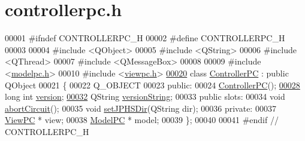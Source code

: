 \hypertarget{controllerpc_8h_source}{}\section{controllerpc.\+h}

\begin{DoxyCode}
00001 \textcolor{preprocessor}{#ifndef CONTROLLERPC\_H}
00002 \textcolor{preprocessor}{#define CONTROLLERPC\_H}
00003 
00004 \textcolor{preprocessor}{#include <QObject>}
00005 \textcolor{preprocessor}{#include <QString>}
00006 \textcolor{preprocessor}{#include <QThread>}
00007 \textcolor{preprocessor}{#include <QMessageBox>}
00008 
00009 \textcolor{preprocessor}{#include <\hyperlink{modelpc_8h}{modelpc.h}>}
00010 \textcolor{preprocessor}{#include <\hyperlink{viewpc_8h}{viewpc.h}>}
\hypertarget{controllerpc_8h_source.tex_l00020}{}\hyperlink{class_controller_p_c}{00020} \textcolor{keyword}{class }\hyperlink{class_controller_p_c}{ControllerPC} : \textcolor{keyword}{public} QObject
00021 \{
00022     Q\_OBJECT
00023 \textcolor{keyword}{public}:
00024     \hyperlink{class_controller_p_c_afa6c92d67bf3b6531c42385fc5938003}{ControllerPC}();
\hypertarget{controllerpc_8h_source.tex_l00028}{}\hyperlink{class_controller_p_c_a9eb43c34237d66751a6411e55cf5f55e}{00028}     \textcolor{keywordtype}{long} \textcolor{keywordtype}{int} \hyperlink{class_controller_p_c_a9eb43c34237d66751a6411e55cf5f55e}{version};
\hypertarget{controllerpc_8h_source.tex_l00032}{}\hyperlink{class_controller_p_c_a0e63cca37d6ce2e660f3380400c2c5f3}{00032}     QString \hyperlink{class_controller_p_c_a0e63cca37d6ce2e660f3380400c2c5f3}{versionString};
00033 \textcolor{keyword}{public} slots:
00034     \textcolor{keywordtype}{void} \hyperlink{class_controller_p_c_a8814989f7be1214e06b2e720889066b0}{abortCircuit}();
00035     \textcolor{keywordtype}{void} \hyperlink{class_controller_p_c_ac00d29685a7e5b780c01eb438e10f96d}{setJPHSDir}(QString dir);
00036 \textcolor{keyword}{private}:
00037     \hyperlink{class_view_p_c}{ViewPC} * view;
00038     \hyperlink{class_model_p_c}{ModelPC} * model;
00039 \};
00040 
00041 \textcolor{preprocessor}{#endif // CONTROLLERPC\_H}
\end{DoxyCode}
